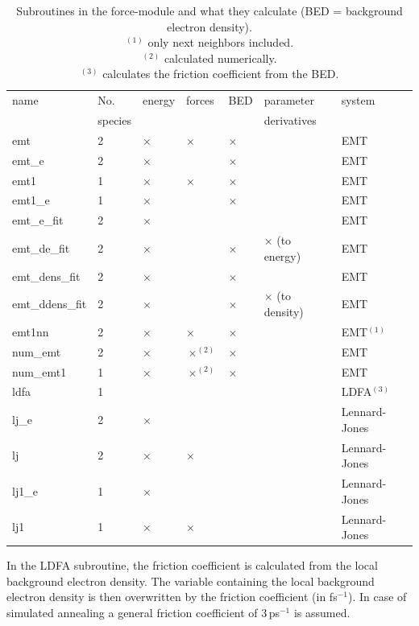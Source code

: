\documentclass[twoside, 11pt, titlepage, captions=nooneline, a4paper, headsepline]{scrbook}%
\newcommand{\9}{\mathrm}
\newcommand{\0}{\,\mathrm}
\begin{document}
\begin{table}[b!]
\centering
\caption{Subroutines in the force-module and what they calculate (BED = background electron density).\\
$^{(1)}$ only next neighbors included.\\
$^{(2)}$ calculated numerically.\\
$^{(3)}$ calculates the friction coefficient from the BED.}
\label{Tab:Funct:force}
\begin{tabular}{lllllll}
\hline\hline
name			&No.	& energy	&forces			&BED		&parameter	& system\\
&species&&&&derivatives&\\
\hline
emt				&2				&$\times$	&$\times$		&$\times$	&						&EMT\\
emt\_e 			&2 				&$\times$	&				&$\times$	&						&EMT\\
emt1			&1				&$\times$	&$\times$		&$\times$	&						&EMT\\
emt1\_e 		&1				&$\times$	&				&$\times$	&						&EMT\\
emt\_e\_fit 	&2 				&$\times$	&				&			&						&EMT\\
emt\_de\_fit 	&2				&$\times$	&				&$\times$	&$\times$ (to energy)	&EMT\\
emt\_dens\_fit	&2				&$\times$	&				&$\times$	&						&EMT\\
emt\_ddens\_fit	&2				&$\times$	&				&$\times$	&$\times$ (to density)	&EMT\\
emt1nn			&2				&$\times$	&$\times$		&$\times$	&						&EMT$^{(1)}$\\
num\_emt		&2				&$\times$	&$\times^{(2)}$	&$\times$	&						&EMT\\
num\_emt1		&1				&$\times$	&$\times^{(2)}$	&$\times$	&						&EMT\\
ldfa			&1				&			&				&			&						&LDFA$^{(3)}$\\
lj\_e			&2				&$\times$	&				&			&						&Lennard-Jones\\
lj				&2				&$\times$	&$\times$		&			&						&Lennard-Jones\\
lj1\_e			&1				&$\times$	&				&			&						&Lennard-Jones\\
lj1				&1				&$\times$	&$\times$		&			&						&Lennard-Jones\\

\hline
\hline
\end{tabular}
\end{table}

In the LDFA subroutine, the friction coefficient is calculated from the local background electron density. The variable containing the local background electron density is then overwritten by the friction coefficient (in fs$^{-1}$). In case of simulated annealing a general friction coefficient of 3\,ps$^{-1}$ is assumed.
\end{document}

